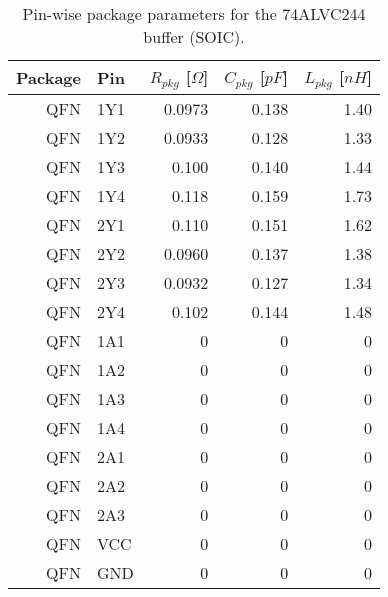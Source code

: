 \documentclass[../main.tex]{subfiles}
\begin{document}
\begin{table}[h]
    \centering
    \begin{tabular}{r|l r r r}
        \toprule[1pt]
        \textbf{Package} & \textbf{Pin} & $R_{pkg}$ [$\si{\Omega}$] & $C_{pkg}$ [$\si{pF}$] & $L_{pkg}$ [$\si{nH}$] \\
        \midrule
        QFN  & 1Y1  & 0.0973 & 0.138 & 1.40 \\
        QFN  & 1Y2  & 0.0933 & 0.128 & 1.33 \\
        QFN  & 1Y3  & 0.100  & 0.140 & 1.44 \\
        QFN  & 1Y4  & 0.118  & 0.159 & 1.73 \\
        QFN  & 2Y1  & 0.110  & 0.151 & 1.62 \\
        QFN  & 2Y2  & 0.0960 & 0.137 & 1.38 \\
        QFN  & 2Y3  & 0.0932 & 0.127 & 1.34 \\
        QFN  & 2Y4  & 0.102  & 0.144 & 1.48 \\
        \midrule
        QFN  & 1A1  & 0 & 0 & 0 \\
        QFN  & 1A2  & 0 & 0 & 0 \\
        QFN  & 1A3  & 0 & 0 & 0 \\
        QFN  & 1A4  & 0 & 0 & 0 \\
        QFN  & 2A1  & 0 & 0 & 0 \\
        QFN  & 2A2  & 0 & 0 & 0 \\
        QFN  & 2A3  & 0 & 0 & 0 \\
        QFN  & VCC  & 0 & 0 & 0 \\
        QFN  & GND  & 0 & 0 & 0 \\
        \bottomrule[1pt]
    \end{tabular}
    \caption{Pin-wise package parameters for the 74ALVC244 buffer (SOIC).}
\end{table}

\newpage
\end{document}
